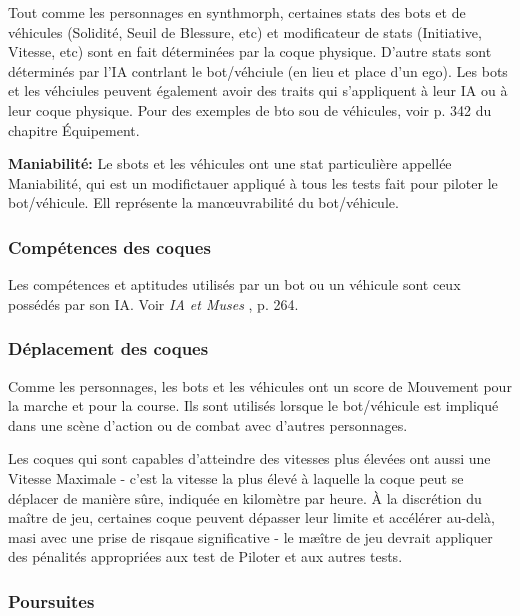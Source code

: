 Tout comme les personnages en synthmorph, certaines stats des bots et de véhicules (Solidité, Seuil de Blessure, etc) et modificateur de stats (Initiative, Vitesse, etc) sont en fait déterminées par la coque physique. D'autre stats sont déterminés par l'IA contrlant le bot/véhciule (en lieu et place d'un ego). Les bots et les véhciules peuvent également avoir des traits qui s'appliquent à leur IA ou à leur coque physique. Pour des exemples de bto sou de véhicules, voir p. 342 du chapitre Équipement. 

\textbf{Maniabilité:} Le sbots et les véhicules ont une stat particulière appellée Maniabilité, qui est un modifictauer appliqué à tous les tests fait pour piloter le bot/véhicule. Ell représente la manœuvrabilité du bot/véhicule. 

\subsubsection{Compétences des coques} 

Les compétences et aptitudes utilisés par un bot ou un véhicule sont ceux possédés par son IA. Voir \emph{IA et Muses }, p. 264. 

\subsubsection{Déplacement des coques} 

Comme les personnages, les bots et les véhicules ont un score de Mouvement pour la marche et pour la course. Ils sont utilisés lorsque le bot/véhicule est impliqué dans une scène d'action ou de combat avec d'autres personnages. 

Les coques qui sont capables d'atteindre des vitesses plus élevées ont aussi une Vitesse Maximale - c'est la vitesse la plus élevé à laquelle la coque peut se déplacer de manière sûre, indiquée en kilomètre par heure. À la discrétion du maître de jeu, certaines coque peuvent dépasser leur limite et accélérer au-delà, masi avec une prise de risqaue significative - le mæître de jeu devrait appliquer des pénalités appropriées aux test de Piloter et aux autres tests. 

\subsubsection{Poursuites} 

